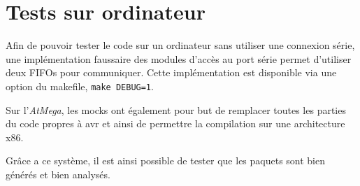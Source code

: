 \section{Tests sur ordinateur}

Afin de pouvoir tester le code sur un ordinateur sans utiliser une connexion série, une implémentation faussaire des modules d'accès au port série permet d'utiliser deux FIFOs pour communiquer. Cette implémentation est disponible via une option du makefile, \texttt{make DEBUG=1}. 

Sur l'\emph{AtMega}, les mocks ont également pour but de remplacer toutes les parties du code propres à avr et ainsi de permettre la compilation sur une architecture x86.

Grâce a ce système, il est ainsi possible de tester que les paquets sont bien générés et bien analysés.
